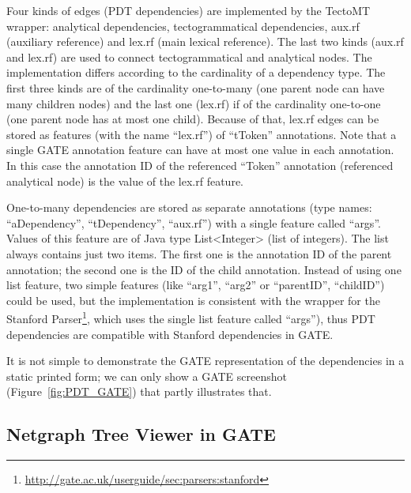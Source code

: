 Four kinds of edges (PDT dependencies) are implemented by the TectoMT wrapper: analytical dependencies, tectogrammatical dependencies, aux.rf (auxiliary reference) and lex.rf (main lexical reference). The last two kinds (aux.rf and lex.rf) are used to connect tectogrammatical and analytical nodes. The implementation differs according to the cardinality of a dependency type. The first three kinds are of the cardinality one-to-many (one parent node can have many children nodes) and the last one (lex.rf) if of the cardinality one-to-one (one parent node has at most one child). Because of that, lex.rf edges can be stored as features (with the name ``lex.rf'') of ``tToken'' annotations. Note that a single GATE annotation feature can have at most one value in each annotation. In this case the annotation ID of the referenced ``Token'' annotation (referenced analytical node) is the value of the lex.rf feature.

One-to-many dependencies are stored as separate annotations (type names: ``aDependency'', ``tDependency'', ``aux.rf'') with a single feature called ``args''. Values of this feature are of Java type List<Integer> (list of integers). The list always contains just two items. The first one is the annotation ID of the parent annotation; the second one is the ID of the child annotation. Instead of using one list feature, two simple features (like ``arg1'', ``arg2'' or ``parentID'', ``childID'') could be used, but the implementation is consistent with the wrapper for the Stanford Parser\footnote{\url{http://gate.ac.uk/userguide/sec:parsers:stanford}}, which uses the single list feature called ``args''), thus PDT dependencies are compatible with Stanford dependencies in GATE.

It is not simple to demonstrate the GATE representation of the dependencies in a static printed form; we can only show a GATE screenshot (Figure~\ref{fig:PDT_GATE}) that partly illustrates that.




\subsection{Netgraph Tree Viewer in GATE} \label{sec:learning_GATE_Netgraph}

